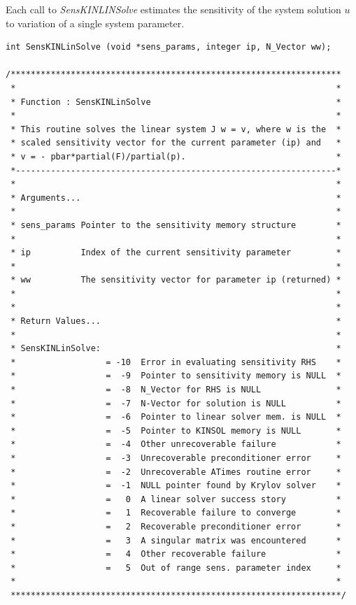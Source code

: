 \documentclass[11pt]{article}
\begin{document}
Each call to {\em SensKINLINSolve} estimates the sensitivity of the
system solution $u$ to variation of a single system parameter.

\small
\begin{verbatim}
int SensKINLinSolve (void *sens_params, integer ip, N_Vector ww);

/******************************************************************
 *                                                                *
 * Function : SensKINLinSolve                                     *
 *                                                                *
 * This routine solves the linear system J w = v, where w is the  *
 * scaled sensitivity vector for the current parameter (ip) and   *
 * v = - pbar*partial(F)/partial(p).                              *
 *----------------------------------------------------------------*
 *                                                                *
 * Arguments...                                                   *
 *                                                                *
 * sens_params Pointer to the sensitivity memory structure        *
 *                                                                *
 * ip          Index of the current sensitivity parameter         *
 *                                                                *
 * ww          The sensitivity vector for parameter ip (returned) *
 *                                                                *
 *                                                                *
 * Return Values...                                               *
 *                                                                *
 * SensKINLinSolve:                                               *
 *                  = -10  Error in evaluating sensitivity RHS    *
 *                  =  -9  Pointer to sensitivity memory is NULL  *
 *                  =  -8  N_Vector for RHS is NULL               *
 *                  =  -7  N-Vector for solution is NULL          *
 *                  =  -6  Pointer to linear solver mem. is NULL  *
 *                  =  -5  Pointer to KINSOL memory is NULL       *
 *                  =  -4  Other unrecoverable failure            *
 *                  =  -3  Unrecoverable preconditioner error     *
 *                  =  -2  Unrecoverable ATimes routine error     *
 *                  =  -1  NULL pointer found by Krylov solver    *
 *                  =   0  A linear solver success story          *
 *                  =   1  Recoverable failure to converge        *
 *                  =   2  Recoverable preconditioner error       *
 *                  =   3  A singular matrix was encountered      *
 *                  =   4  Other recoverable failure              *
 *                  =   5  Out of range sens. parameter index     *
 *                                                                *
 ******************************************************************/
\end{verbatim}
\normalsize
\end{document}
